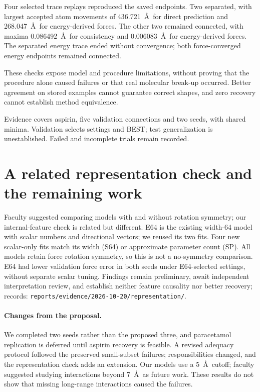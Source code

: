 \documentclass{article}
\begin{document}
Four selected trace replays reproduced the saved endpoints. Two separated, with largest accepted atom movements of 436.721~\AA\ for direct prediction and 268.047~\AA\ for energy-derived forces. The other two remained connected, with maxima 0.086492~\AA\ for consistency and 0.006083~\AA\ for energy-derived forces. The separated energy trace ended without convergence; both force-converged energy endpoints remained connected.

These checks expose model and procedure limitations, without proving that the procedure alone caused failures or that real molecular break-up occurred. Better agreement on stored examples cannot guarantee correct shapes, and zero recovery cannot establish method equivalence.

Evidence covers aspirin, five validation connections and two seeds, with shared minima. Validation selects settings and BEST; test generalization is unestablished. Failed and incomplete trials remain recorded.

\section{A related representation check and the remaining work}
Faculty suggested comparing models with and without rotation symmetry; our internal-feature check is related but different. E64 is the existing width-64 model with scalar numbers and directional vectors; we reused its two fits. Four new scalar-only fits match its width (S64) or approximate parameter count (SP). All models retain force rotation symmetry, so this is not a no-symmetry comparison. E64 had lower validation force error in both seeds under E64-selected settings, without separate scalar tuning. Findings remain preliminary, await independent interpretation review, and establish neither feature causality nor better recovery; records: \nolinkurl{reports/evidence/2026-10-20/representation/}.

\paragraph{Changes from the proposal.}
We completed two seeds rather than the proposed three, and paracetamol replication is deferred until aspirin recovery is feasible. A revised adequacy protocol followed the preserved small-subset failures; responsibilities changed, and the representation check adds an extension. Our models use a 5~\AA\ cutoff; faculty suggested studying interactions beyond 7~\AA\ as future work. These results do not show that missing long-range interactions caused the failures.
\end{document}
